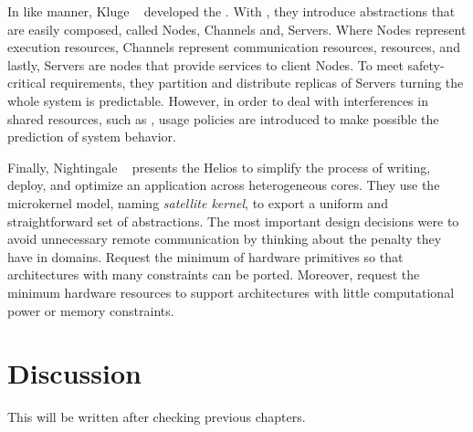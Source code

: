 	In like manner, Kluge \etal~\cite{Kluge2014} developed the \moosca.
	With \moosca, they introduce abstractions that are easily composed, called Nodes,
	Channels and, Servers.
	Where Nodes represent execution resources, Channels represent communication
	resources, \ie \noc resources, and lastly, Servers are nodes that provide
	services to client Nodes.
	To meet safety-critical requirements, they partition \manycore and distribute
	replicas of Servers turning the whole system is predictable.
	However, in order to deal with interferences in shared resources, such as \noc,
	usage policies are introduced to make possible the prediction of system behavior.

	Finally, Nightingale \etal~\cite{nightingale2009} presents the Helios \os to
	simplify the process of writing, deploy, and optimize an application across
	heterogeneous cores.
	They use the microkernel model, naming \textit{satellite kernel}, to export
	a uniform and straightforward set of \os abstractions.
	The most important design decisions were to avoid unnecessary remote communication
	by thinking about the penalty they have in \numa domains.
	Request the minimum of hardware primitives so that architectures with many
	constraints can be ported.
	Moreover, request the minimum hardware resources to support architectures with little
	computational power or memory constraints.

\section{Discussion}

	This will be written after checking previous chapters.